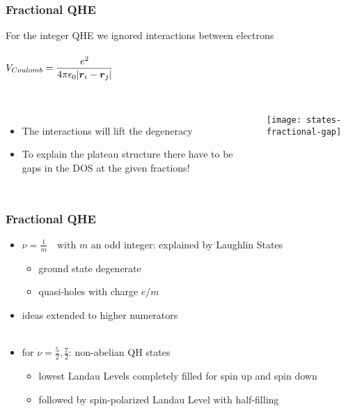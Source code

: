 \begin{frame}
\frametitle{Fractional QHE}
For the integer QHE we ignored interactions between electrons\\\ \\

$V_{Coulomb} = \dfrac{e^2}{4\pi\epsilon_0\abs{\boldsymbol{r}_i - \boldsymbol{r}_j}}$\\\ \\
\begin{columns}
	\column[]{6.5cm}
	\begin{itemize}
		\item The interactions will lift the degeneracy
		\item To explain the plateau structure there have to be gaps in the DOS at the given fractions!
	\end{itemize}
	
	
	\column[]{5.5cm}
	\centering
	\texttt{[image: states-fractional-gap]}
\end{columns}

\end{frame}

\begin{frame}
\frametitle{Fractional QHE}
\begin{itemize}
	\item $\nu = \frac{1}{m} \quad \text{with } m$ an odd integer: explained by Laughlin States\\
	\begin{itemize}
		\item ground state degenerate
		\item quasi-holes with charge $e/m$
	\end{itemize}
	\item ideas extended to higher numerators\\\ \\
	\item for $\nu = \frac{5}{2}, \frac{7}{2}$: \quad non-abelian QH states
	\begin{itemize}
		\item lowest Landau Levels completely filled for spin up and spin down
		\item followed by spin-polarized Landau Level with half-filling
	\end{itemize}
\end{itemize}
\end{frame}





